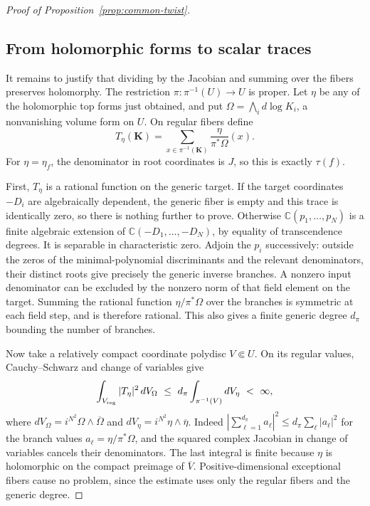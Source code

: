 \begin{proof}[Proof of Proposition~\ref{prop:common-twist}]
\subsection{From holomorphic forms to scalar traces}

It remains to justify that dividing by the Jacobian and summing over
the fibers preserves holomorphy. The restriction
$\pi:\pi^{-1}(U)\to U$ is proper. Let $\eta$ be any of the
holomorphic top forms just obtained, and put
$\Omega=\bigwedge_i d\log K_i$, a nonvanishing volume form on $U$.
On regular fibers define
\[
 T_\eta(\mathbf K)=
 \sum_{x\in\pi^{-1}(\mathbf K)}
       \frac{\eta}{\pi^*\Omega}(x).
\]
For $\eta=\eta_f$, the denominator in root coordinates is $J$, so this
is exactly $\tau(f)$.

First, $T_\eta$ is a rational function on the generic target.
If the target coordinates $-D_i$ are algebraically dependent, the
generic fiber is empty and this trace is identically zero, so there is
nothing further to prove. Otherwise
$\mathbb C(p_1,\ldots,p_N)$ is a finite algebraic extension of
$\mathbb C(-D_1,\ldots,-D_N)$, by equality of transcendence degrees.
It is separable in characteristic zero. Adjoin the $p_i$ successively:
outside the zeros of the minimal-polynomial discriminants and the
relevant denominators, their distinct roots give precisely the
generic inverse branches. A nonzero input denominator can be
excluded by the nonzero norm of that field element on the target.
Summing the rational function $\eta/\pi^*\Omega$ over the branches
is symmetric at each field step, and is therefore rational. This
also gives a finite generic degree $d_\pi$ bounding the number of
branches.

Now take a relatively compact coordinate polydisc $V\Subset U$.
On its regular values, Cauchy--Schwarz and change of variables give
\begin{equation}\label{eq:common-twist-L2}
 \int_{V_{\rm reg}}|T_\eta|^2\,dV_\Omega
 \ \le\ d_\pi\int_{\pi^{-1}(V)}dV_\eta
 \ <\ \infty,
\end{equation}
where $dV_\Omega=i^{N^2}\Omega\wedge\overline\Omega$ and
$dV_\eta=i^{N^2}\eta\wedge\overline\eta$. Indeed
$|\sum_{\ell=1}^{d_\pi}a_\ell|^2\le
d_\pi\sum_\ell|a_\ell|^2$ for the branch values
$a_\ell=\eta/\pi^*\Omega$, and the squared complex Jacobian in
change of variables cancels their denominators. The last integral
is finite because $\eta$ is holomorphic on the compact preimage
of $\overline V$. Positive-dimensional exceptional fibers cause
no problem, since the estimate uses only the regular fibers and
the generic degree.


\end{proof}
